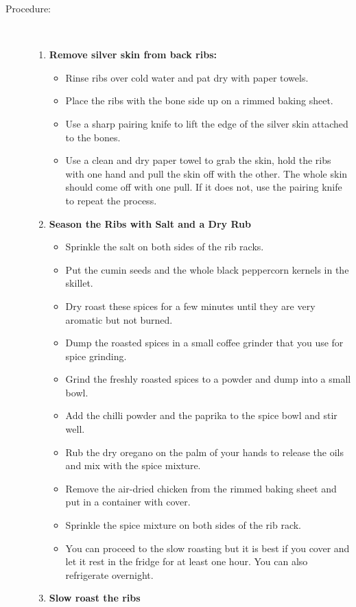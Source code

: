 \documentclass [11pt, letterpaper] {article}
\begin{document}
\begin{description}
\item[Procedure:]\ \\
	\begin{enumerate}
	\item {\bf Remove silver skin from back ribs:}
		\begin{itemize}
		\item Rinse ribs over cold water and pat dry with paper towels.
		\item Place the ribs with the bone side up on a rimmed baking sheet.
		\item Use a sharp pairing knife to lift the edge of the silver skin attached to the bones. 
		\item Use a clean and dry paper towel to grab the skin, hold the ribs with one hand and pull the skin off with the other. The whole skin should come off with one pull. If it does not, use the pairing knife to repeat the process.
		\end{itemize}
	\item {\bf Season the Ribs with Salt and a Dry Rub}
		\begin{itemize}
		\item Sprinkle the salt on both sides of the rib racks.
		\item Put the cumin seeds and the whole black peppercorn kernels in the skillet.
		\item Dry roast these spices for a few minutes until they are very aromatic but not burned.
		\item Dump the roasted spices in a small coffee grinder that you use for spice grinding.
		\item Grind the freshly roasted spices to a powder and dump into a small bowl.
		\item Add the chilli powder and the paprika to the spice bowl and stir well.
                \item Rub the dry oregano on the palm  of your hands to release the oils and mix with the spice mixture.
		\item Remove the air-dried chicken from the rimmed baking sheet and put in a container with cover.
		\item Sprinkle the spice mixture on both sides of the rib rack. 
		\item You can proceed to the slow roasting but it is best if you cover and let it rest in the fridge for at least one hour. You can also refrigerate overnight.
		\end{itemize}
	\item {\bf Slow roast the ribs}

\end{enumerate}
\end{description}
\end{document}
